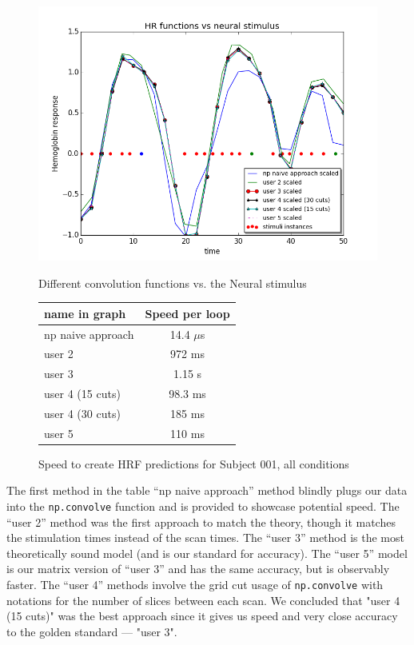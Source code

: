 \begin{figure}[ht]
\centering
	\begin{minipage}[b]{0.45\linewidth}
		\centering
		\includegraphics[width=.8\linewidth]{../images/convolution_vs_neural_stimulus}
		\caption{\scriptsize{Different convolution functions vs. the Neural stimulus}}
		\label{fig:convolution}

	\end{minipage}
\quad
	\begin{minipage}[b]{0.45\linewidth}
		\centering
		\begin{tabular}{|l | c|}
		\hline
		name in graph       & Speed per loop \\
		\hline
		np naive approach & 14.4 $\mu$s  \\
		user 2     		    & 972 ms  \\
		user 3     		    & 1.15 s    \\
		user 4 (15 cuts)      & 98.3 ms \\
		user 4 (30 cuts)      & 185 ms  \\
		user 5     	 	    & 110 ms   \\
		\hline
		\end{tabular}
		\vspace{5mm}
		\caption{\scriptsize{Speed to create HRF predictions for Subject 001, 
		all conditions}}
		\label{table:convolution}
	\end{minipage}
\end{figure}

The first method in the table ``np naive approach'' method blindly plugs 
our data into the \texttt{np.convolve} function and is provided to showcase 
potential speed. The ``user 2'' method  was the first approach to match the 
theory, though it matches the stimulation times instead of the scan times. 
The ``user 3'' method is the most theoretically sound model (and is our 
standard for accuracy). The ``user 5'' model  is our matrix version of  
``user 3'' and has the same accuracy, but is observably faster. The 
``user 4'' methods involve the grid cut usage of \texttt{np.convolve}
with notations for the number of slices between each scan. We concluded that 
"user 4 (15 cuts)" was the best approach since it gives us speed and very 
close accuracy to the golden standard --- "user 3".






